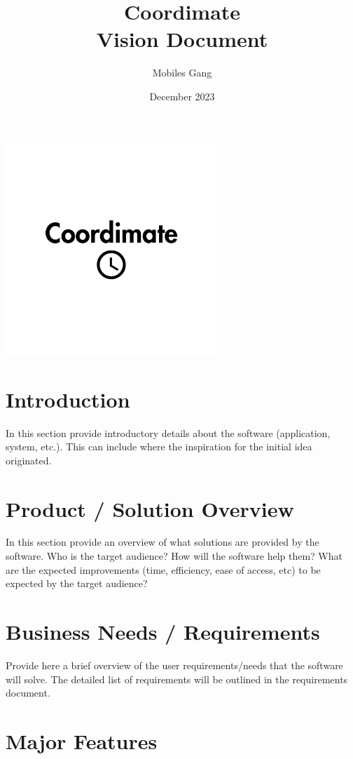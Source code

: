 \documentclass{article}
\title{Coordimate\\Vision Document}
\date{December 2023}
\author{Mobiles Gang}
\begin{document}
\maketitle

\begin{center}
\includegraphics[width=8cm]{coordimate-logo}
\end{center}

\section{Introduction}

In this section provide introductory details about the software (application,
system, etc.). This can include where the inspiration for the initial idea
originated.

\section{Product / Solution Overview}

In this section provide an overview of what solutions are provided by the
software. Who is the target audience? How will the software help them? What are
the expected improvements (time, efficiency, ease of access, etc) to be
expected by the target audience?

\section{Business Needs / Requirements}

Provide here a brief overview of the user requirements/needs that the software
will solve. The detailed list of requirements will be outlined in the
requirements document.

\section{Major Features}
\end{document}
